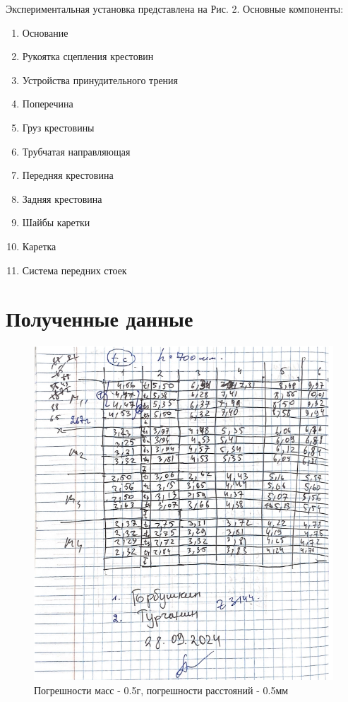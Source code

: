 \documentclass[a4paper]{article}
\begin{document}
Экспериментальная установка представлена на Рис. 2. Основные компоненты:
\begin{enumerate}
    \item Основание
    \item Рукоятка сцепления крестовин
    \item Устройства принудительного трения
    \item Поперечина
    \item Груз крестовины
    \item Трубчатая направляющая
    \item Передняя крестовина
    \item Задняя крестовина
    \item Шайбы каретки
    \item Каретка
    \item Система передних стоек
\end{enumerate}

\section{Полученные данные}

\begin{figure}[H]
\begin{center}
	\includegraphics[scale=0.5]{данные.png}
	\caption{Погрешности масс - 0.5г, погрешности расстояний - 0.5мм}
\end{center}
\end{figure}
\end{document}
